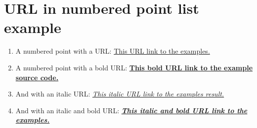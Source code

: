 \documentclass[a4paper]{report}
\begin{document}
\chapter{URL in numbered point list example}
\begin{enumerate}
\item A numbered point with a URL: \href{https://github.com/tom-bjorkholm/mformat/blob/master/example/src}{This URL link to the examples.}
\item A numbered point with a bold URL: \textbf{\href{https://github.com/tom-bjorkholm/mformat/blob/master/example/src}{This bold URL link to the example source code.}}
\item And with an italic URL: \textit{\href{https://github.com/tom-bjorkholm/mformat/blob/master/example/result}{This italic URL link to the examples result.}}
\item And with an italic and bold URL: \textit{\textbf{\href{https://github.com/tom-bjorkholm/mformat/blob/master/example/src}{This italic and bold URL link to the examples.}}}
\end{enumerate}
\end{document}
